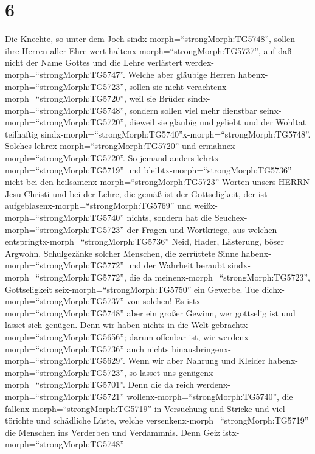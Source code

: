 \hypertarget{section-5}{%
\section{6}\label{section-5}}

 Die Knechte, so unter dem Joch
sindx-morph=``strongMorph:TG5748'', sollen ihre Herren aller Ehre wert
haltenx-morph=``strongMorph:TG5737'', auf daß nicht der Name Gottes und
die Lehre verlästert werdex-morph=``strongMorph:TG5747''. 
Welche aber gläubige Herren habenx-morph=``strongMorph:TG5723'', sollen
sie nicht verachtenx-morph=``strongMorph:TG5720'', weil sie Brüder
sindx-morph=``strongMorph:TG5748'', sondern sollen viel mehr dienstbar
seinx-morph=``strongMorph:TG5720'', dieweil sie gläubig und geliebt und
der Wohltat teilhaftig
sindx-morph=``strongMorph:TG5740''x-morph=``strongMorph:TG5748''.
Solches lehrex-morph=``strongMorph:TG5720'' und
ermahnex-morph=``strongMorph:TG5720''.  So jemand anders
lehrtx-morph=``strongMorph:TG5719'' und
bleibtx-morph=``strongMorph:TG5736'' nicht bei den
heilsamenx-morph=``strongMorph:TG5723'' Worten unsers HERRN Jesu Christi
und bei der Lehre, die gemäß ist der Gottseligkeit,  der ist
aufgeblasenx-morph=``strongMorph:TG5769'' und
weißx-morph=``strongMorph:TG5740'' nichts, sondern hat die
Seuchex-morph=``strongMorph:TG5723'' der Fragen und Wortkriege, aus
welchen entspringtx-morph=``strongMorph:TG5736'' Neid, Hader, Lästerung,
böser Argwohn.  Schulgezänke solcher Menschen, die
zerrüttete Sinne habenx-morph=``strongMorph:TG5772'' und der Wahrheit
beraubt sindx-morph=``strongMorph:TG5772'', die da
meinenx-morph=``strongMorph:TG5723'', Gottseligkeit
seix-morph=``strongMorph:TG5750'' ein Gewerbe. Tue
dichx-morph=``strongMorph:TG5737'' von solchen!  Es
istx-morph=``strongMorph:TG5748'' aber ein großer Gewinn, wer gottselig
ist und lässet sich genügen.  Denn wir haben nichts in die
Welt gebrachtx-morph=``strongMorph:TG5656''; darum offenbar ist, wir
werdenx-morph=``strongMorph:TG5736'' auch nichts
hinausbringenx-morph=``strongMorph:TG5629''.  Wenn wir aber
Nahrung und Kleider habenx-morph=``strongMorph:TG5723'', so lasset uns
genügenx-morph=``strongMorph:TG5701''.  Denn die da reich
werdenx-morph=``strongMorph:TG5721''
wollenx-morph=``strongMorph:TG5740'', die
fallenx-morph=``strongMorph:TG5719'' in Versuchung und Stricke und viel
törichte und schädliche Lüste, welche
versenkenx-morph=``strongMorph:TG5719'' die Menschen ins Verderben und
Verdammnis.  Denn Geiz istx-morph=``strongMorph:TG5748''
